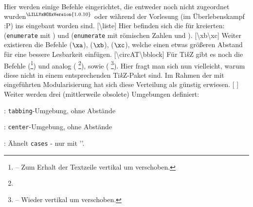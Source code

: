 Hier werden einige Befehle eingerichtet, die entweder noch nicht zugeordnet wurden\({}^{\tiny \LILLYxBOXxVersion{\tiny 1.0.10}}\) oder während der Vorlesung (im Überlebenskampf :P) ins  eingebaut worden sind.
%
%
%
[\cmdlist \textbackslash liste]
Hier befinden sich die für \la kreierten:  (\verb|enumerate| mit \newline{}) und  (\verb|enumerate| mit römischen Zahlen und \newline{}). \medskip\newline %
%
%
%
[\cmdlist \textbackslash xb\cmdlist \textbackslash xc]
Weiter existieren die Befehle  ($\xa$),  ($\xb$),  ($\xc$), welche einen etwas größeren Abstand für eine bessere Lesbarkeit einfügen. \medskip\newline
{}[\cmdlist \textbackslash circAT\cmdlist \textbackslash bblock]
Für Ti\textit{k}Z gibt es noch die Befehle  (\footnote{ -- Zum Erhalt der Textzeile vertikal um  verschoben.}) und analog\newline {} ( \footnote{}), sowie  ( \footnote{ -- Wieder vertikal um  verschoben.}). Hier fragt man sich nun vielleicht, warum diese nicht in einem entsprechenden Ti\textit{k}Z-Paket sind. Im Rahmen der mit  eingeführten Modularisierung hat sich diese Verteilung als günstig erwiesen. %
\newline
%
%
%
[\cmdlist {}\cmdlist {} \cmdold]
Weiter werden drei (mittlerweile obsolete) Umgebungen definiert: \begin{ditemize}\narrowitems
    \item {}:  \verb|tabbing|-Umgebung, ohne Abstände
    \item {}: \verb|center|-Umgebung, ohne Abstände
    \item {}: Ähnelt \verb|cases| - nur mit '\T{]}'.
\end{ditemize}
